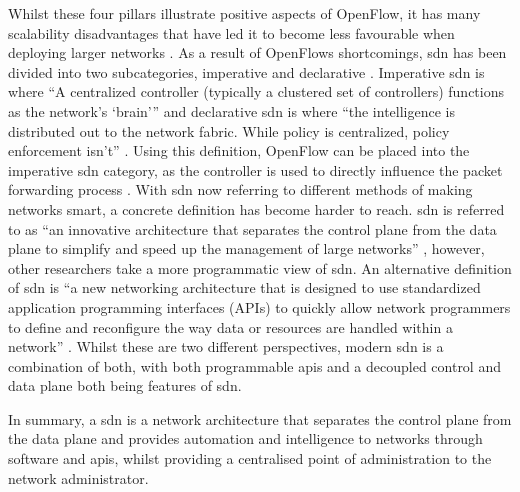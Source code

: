 Whilst these four pillars illustrate positive aspects of OpenFlow, it has many scalability disadvantages that have led it to become less favourable when deploying larger networks \citep{8784036}. As a result of OpenFlows shortcomings, \gls{sdn} has been divided into two subcategories, imperative and declarative \citep{10}. Imperative \gls{sdn} is where ``A centralized controller (typically a clustered set of controllers) functions as
the network’s ‘brain’'' \citep{10} and declarative \gls{sdn} is where ``the intelligence is distributed out to the network fabric. While policy is centralized, policy enforcement isn’t'' \citep{10}. Using this definition,
OpenFlow can be placed into the imperative \gls{sdn} category, as the controller is used to directly influence the packet forwarding process \citep{11}. With \gls{sdn} now referring to different methods of making networks smart, a concrete definition has become harder to reach. \gls{sdn} is referred to as ``an innovative architecture that separates the control plane from the data plane to simplify and speed up the management of large networks'' \citep{app11156999}, however, other researchers take a more programmatic view of \gls{sdn}. An alternative definition of \gls{sdn} is ``a new networking architecture that is designed to use standardized application programming interfaces (APIs) to quickly allow network programmers to define and reconfigure the way data or resources are handled within a network'' \citep{9}. Whilst these are two different perspectives, modern \gls{sdn} is a combination of both, with both programmable \gls{api}s and a decoupled control and data plane both being features of \gls{sdn}.

In summary, a \gls{sdn} is a network architecture that separates the control plane from the data plane and provides automation and intelligence to networks through software and \gls{api}s, whilst providing a centralised point of administration to the network administrator.

